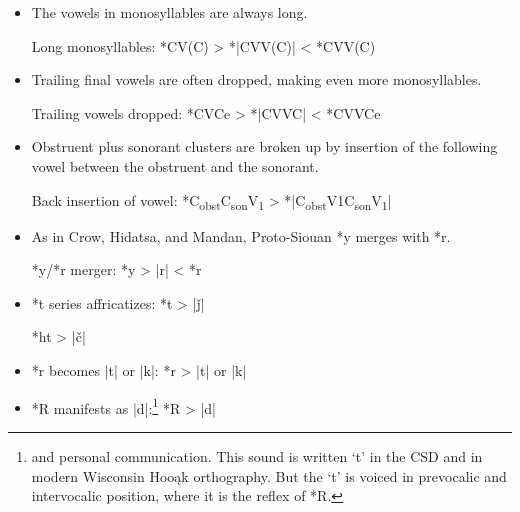 \documentclass[output=paper]{LSP/langsci}
\begin{document}
\begin{itemize}
\item The vowels in monosyllables are always long.


Long monosyllables: \hspace{1em} *CV(C)    >	*|CVV(C)|     <	*CVV(C)
\item Trailing final vowels are often dropped, making even more monosyllables.


Trailing vowels dropped: \hspace{1em} 	*CVCe    >	*|CVVC|        <	*CVVCe
\item Obstruent plus sonorant clusters are broken up by insertion of the following vowel between the obstruent and the sonorant.


Back insertion of vowel:	 \hspace{1em}  *C\textsubscript{obst}C\textsubscript{son}V\textsubscript{1}    >	*|C\textsubscript{obst}V1C\textsubscript{son}V\textsubscript{1}|
\item As in Crow, Hidatsa, and Mandan, Proto-Siouan *y merges with *r.


*y/*r merger: \hspace{1em} *y	>	|r|	<	*r
\item *t series affricatizes: \hspace{1em} *t  >  |\v{j}|  

\hspace{9.2em} *ht	 >  |\v{c}|  

\item *r\textsuperscript{} becomes |t\textsuperscript{}| or |k\textsuperscript{}|: \hspace{1em} *r\textsuperscript{}	>	|t\textsuperscript{}| or |k\textsuperscript{}|
\item *R manifests as |d|:\footnote{\citet{HelmbrechtND} and personal communication. This sound is written `t' in the CSD and in modern Wisconsin Hoo\k{a}k orthography. But the `t' is voiced in prevocalic and intervocalic position, where it is the reflex of *R.} \hspace{2em} *R	>	|d|
\end{itemize}

\end{document}

